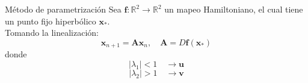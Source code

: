 \documentclass[11pt]{beamer}
\newtheorem{teorema}[theorem]{Teorema}
\theoremstyle{definition}
\begin{document}
\begin{frame}{M\'etodo de parametrizaci\'on}
Sea $\mathbf{f}:\mathbb{R}^{2}\rightarrow\mathbb{R}^{2}$ un mapeo Hamiltoniano, el cual tiene un punto fijo hiperb\'olico $\mathbf{x}_{*}$.\\
Tomando la linealización:
\begin{equation}
\mathbf{x}_{n+1} =\mathbf{A}\mathbf{x}_{n}, \quad \mathbf{A}=D\mathbf{f}(\mathbf{x}_{*})
\label{sistema_lineal}
\end{equation}
donde \\
\begin{equation}
\vert \lambda_{1}\vert<1 \quad \rightarrow \mathbf{u}
\label{primer_valorp}
\end{equation}
\begin{equation}
\vert \lambda_{2}\vert>1 \quad \rightarrow \mathbf{v}
\label{segundo_valorp}
\end{equation}

\end{frame}
\end{document}
